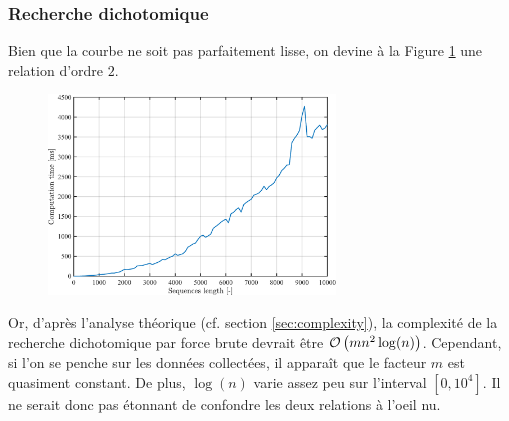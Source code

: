 \documentclass[a4paper, 12pt]{article}
\begin{document}
	\subsubsection*{Recherche dichotomique}
	Bien que la courbe ne soit pas parfaitement lisse, on devine à la Figure \ref{fig:dichotomic} une relation d'ordre $2$.
	\begin{figure}[H]
		\centering
		\includegraphics[width=0.68\textwidth]{resources/pdf/dichotomic.pdf}
		\label{fig:dichotomic}
	\end{figure}
	Or, d'après l'analyse théorique (cf. section \ref{sec:complexity}), la complexité de la recherche dichotomique par force brute devrait être $\mathcal{O}\left(m n^2 \log(n)\right)$. Cependant, si l'on se penche sur les données collectées, il apparaît que le facteur $m$ est quasiment constant. De plus, $\log(n)$ varie assez peu sur l'interval $[0, 10^4]$. Il ne serait donc pas étonnant de confondre les deux relations à l'oeil nu.
\end{document}
